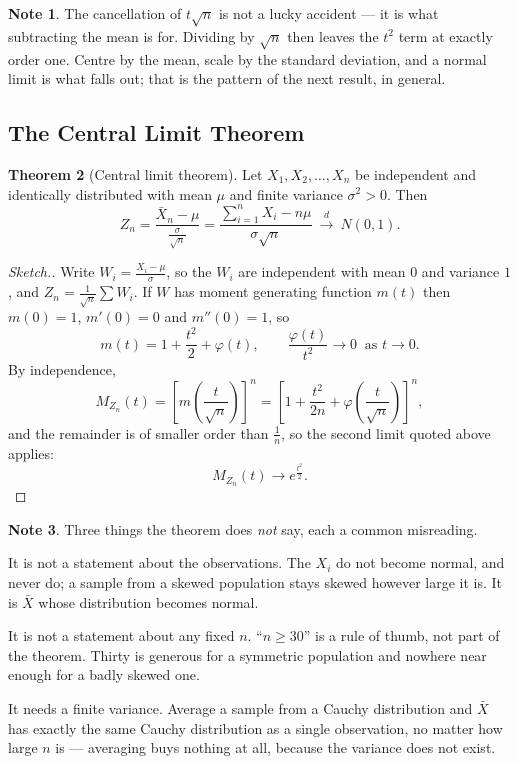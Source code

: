 \documentclass[12pt,a4paper]{report}
\theoremstyle{definition}
\newtheorem{thm}{Theorem}[section]
\newtheorem{note}[thm]{Note}
\theoremstyle{plain}
\begin{document}
\begin{note}
The cancellation of $t\sqrt n$ is not a lucky accident --- it is what subtracting
the mean is for. Dividing by $\sqrt n$ then leaves the $t^2$ term at exactly order
one. Centre by the mean, scale by the standard deviation, and a normal limit is
what falls out; that is the pattern of the next result, in general.
\end{note}

\subsection{The Central Limit Theorem}

\begin{thm}[Central limit theorem]
Let $X_1,X_2,\ldots,X_n$ be independent and identically distributed with mean
$\mu$ and finite variance $\sigma^2>0$. Then
\[Z_n=\frac{\bar X_n-\mu}{\frac{\sigma}{\sqrt n}}
=\frac{\sum_{i=1}^nX_i-n\mu}{\sigma\sqrt n}
\ \overset{d}{\longrightarrow}\ N(0,1).\]
\end{thm}

\begin{proof}[\textit{Sketch}.]
Write $W_i=\frac{X_i-\mu}{\sigma}$, so the $W_i$ are independent with mean $0$ and
variance $1$, and $Z_n=\frac{1}{\sqrt n}\sum W_i$. If $W$ has moment generating
function $m(t)$ then $m(0)=1$, $m'(0)=0$ and $m''(0)=1$, so
\[m(t)=1+\frac{t^2}{2}+\varphi(t),\qquad
\frac{\varphi(t)}{t^2}\to0\ \text{ as }t\to0.\]
By independence,
\[M_{Z_n}(t)=\left[m\!\left(\frac{t}{\sqrt n}\right)\right]^n
=\left[1+\frac{t^2}{2n}+\varphi\!\left(\frac{t}{\sqrt n}\right)\right]^n,\]
and the remainder is of smaller order than $\frac1n$, so the second limit quoted
above applies:
\[M_{Z_n}(t)\longrightarrow e^{\frac{t^2}{2}}.\]
\end{proof}

\begin{note}
Three things the theorem does \emph{not} say, each a common misreading.

It is not a statement about the observations. The $X_i$ do not become normal, and
never do; a sample from a skewed population stays skewed however large it is. It
is $\bar X$ whose distribution becomes normal.

It is not a statement about any fixed $n$. ``$n\geq30$'' is a rule of thumb, not
part of the theorem. Thirty is generous for a symmetric population and nowhere
near enough for a badly skewed one.

It needs a finite variance. Average a sample from a Cauchy distribution and
$\bar X$ has exactly the same Cauchy distribution as a single observation, no
matter how large $n$ is --- averaging buys nothing at all, because the variance
does not exist.
\end{note}
\end{document}
